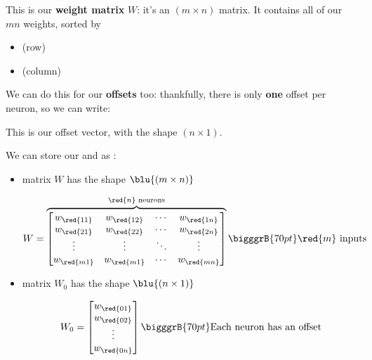         This is our \textbf{weight matrix} $W$: it's an $(m \times n)$ matrix. It contains all of our $mn$ weights, sorted by
        
        \begin{itemize}
            \item {} (row)
            \item {} (column)
        \end{itemize} 
        
        We can do this for our \textbf{offsets} too: thankfully, there is only \textbf{one} offset per neuron, so we can write:
        
        
        
        This is our offset vector, with the shape $(n \times 1)$.\\
        
        \begin{notation}
            We can store our  and  as :
            
            \begin{itemize}
                \item {} matrix $W$ has the shape $\blu{(m \times n)}$

                \begin{equation*}
                    W = 
                    \overbrace{
                        \begin{bmatrix}
                          w_{\red{11}} & w_{\red{12}} & \cdots & w_{\red{1n}} \\
                          w_{\red{21}} & w_{\red{22}} & \cdots & w_{\red{2n}} \\
                          \vdots       & \vdots       & \ddots & \vdots \\
                          w_{\red{m1}} & w_{\red{m1}} & \cdots & w_{\red{mn}} \\
                        \end{bmatrix}
                    }^{\red{n} \text{ neurons}}
                    \bigggrB{70pt} \red{m} \text{ inputs}
                \end{equation*}
                
                \item {} matrix $W_0$ has the shape $\blu{(n \times 1)}$

                \begin{equation*}
                    W_0 = 
                        \begin{bmatrix}
                          w_{\red{01}} \\ w_{\red{02}} \\ \vdots \\ w_{\red{0n}}
                        \end{bmatrix}
                    \bigggrB{70pt} \text{Each neuron has an offset}
                \end{equation*}
            \end{itemize}
        \end{notation}
        
